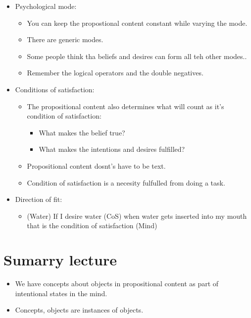 \begin{itemize}
    \item Psychological mode:
        \begin{itemize}
            \item You can keep the propostional content constant while varying the mode.
            \item There are generic modes.
            \item Some people think tha beliefs and desires can form all teh other modes..
            \item Remember the logical operators and the double negatives.
        \end{itemize}
        \item Conditions of satisfaction:
        \begin{itemize}
            \item The propositional content also determines what will count as it's condition of satisfaction:
                \begin{itemize}
                    \item What makes the belief true? 
                    \item What makes the intentions and desires fulfilled?
                \end{itemize}
            
            \item Propositional content dosnt's have to be text.
            \item Condition of satisfaction is a necesity fulfulled from doing a task.
        \end{itemize}
    
    \item Direction of fit:
        \begin{itemize}
            \item (Water) If I desire water (CoS) when water gets inserted into my mouth that is the condition of satisfaction (Mind)
        \end{itemize}
\end{itemize}



\section{Sumarry lecture}
\begin{itemize}
    \item We have concepts about objects in propositional content as part of intentional states in the mind.
    \item Concepts, objects are instances of objects.
\end{itemize}



